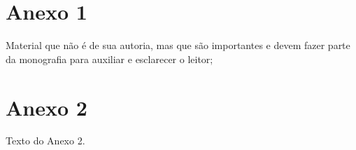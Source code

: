\chapter{Anexo 1}
\label{Anexo1}
\hspace{0,5cm}

Material que n\~{a}o \'{e} de sua autoria, mas que s\~{a}o importantes e devem fazer parte da monografia para auxiliar e esclarecer o leitor;


\chapter{Anexo 2}
\label{Anexo2}

Texto do Anexo 2.



